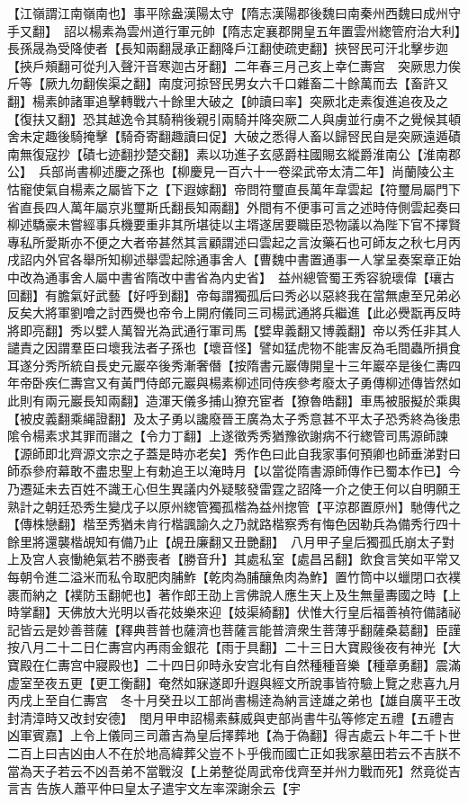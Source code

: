 【江嶺謂江南嶺南也】事平除盎漢陽太守【隋志漢陽郡後魏曰南秦州西魏曰成州守手又翻】　詔以楊素為雲州道行軍元帥【隋志定襄郡開皇五年置雲州緫管府治大利】長孫晟為受降使者【長知兩翻晟承正翻降戶江翻使疏吏翻】挾唘民可汗北擊步迦【挾戶頰翻可從刋入聲汗音寒迦古牙翻】二年春三月己亥上幸仁夀宫　突厥思力俟斤等【厥九勿翻俟渠之翻】南度河掠唘民男女六千口雜畜二十餘萬而去【畜許又翻】楊素帥諸軍追擊轉戰六十餘里大破之【帥讀曰率】突厥北走素復進追夜及之【復扶又翻】恐其越逸令其騎稍後親引兩騎并降突厥二人與虜並行虜不之覺候其頓舍未定趣後騎掩擊【騎奇寄翻趣讀曰促】大破之悉得人畜以歸唘民自是突厥遠遁磧南無復寇抄【磧七迹翻抄楚交翻】素以功進子玄感爵柱國賜玄縱爵淮南公【淮南郡公】　兵部尚書柳述慶之孫也【柳慶見一百六十一卷梁武帝太清二年】尚蘭陵公主怙寵使氣自楊素之屬皆下之【下遐嫁翻】帝問符璽直長萬年韋雲起【符璽局屬門下省直長四人萬年屬京兆璽斯氏翻長知兩翻】外間有不便事可言之述時侍側雲起奏曰柳述驕豪未嘗經事兵機要重非其所堪徒以主壻遂居要職臣恐物議以為陛下官不擇賢專私所愛斯亦不便之大者帝甚然其言顧謂述曰雲起之言汝藥石也可師友之秋七月丙戌詔内外官各舉所知柳述舉雲起除通事舍人【曹魏中書置通事一人掌呈奏案章正始中改為通事舍人屬中書省隋改中書省為内史省】　益州總管蜀王秀容貌瓌偉【瓖古回翻】有膽氣好武藝【好呼到翻】帝每謂獨孤后曰秀必以惡終我在當無慮至兄弟必反矣大將軍劉噲之討西㸑也帝令上開府儀同三司楊武通將兵繼進【此必㸑翫再反時將即亮翻】秀以嬖人萬智光為武通行軍司馬【嬖卑義翻又博義翻】帝以秀任非其人譴責之因謂羣臣曰壞我法者子孫也【壞音怪】譬如猛虎物不能害反為毛間蟲所損食耳遂分秀所統自長史元巖卒後秀漸奢僭【按隋書元巖傳開皇十三年巖卒是後仁夀四年帝卧疾仁夀宫又有黃門侍郎元巖與楊素柳述同侍疾參考廢太子勇傳柳述傳皆然如此則有兩元巖長知兩翻】造渾天儀多捕山獠充宦者【獠魯皓翻】車馬被服擬於乘輿【被皮義翻乘䋲證翻】及太子勇以讒廢晉王廣為太子秀意甚不平太子恐秀終為後患隂令楊素求其罪而譖之【令力丁翻】上遂徵秀秀猶豫欲謝病不行緫管司馬源師諫【源師即北齊源文宗之子蓋是時亦老矣】秀作色曰此自我家事何預卿也師垂涕對曰師忝參府幕敢不盡忠聖上有勅追王以淹時月【以當從隋書源師傳作已蜀本作已】今乃遷延未去百姓不識王心但生異議内外疑駭發雷霆之詔降一介之使王何以自明願王熟計之朝廷恐秀生變戊子以原州緫管獨孤楷為益州揔管【平涼郡置原州】馳傳代之【傳株戀翻】楷至秀猶未肯行楷諷諭久之乃就路楷察秀有悔色因勒兵為備秀行四十餘里將還襲楷覘知有備乃止【覘丑廉翻又丑艷翻】　八月甲子皇后獨孤氏崩太子對上及宫人哀慟絶氣若不勝喪者【勝音升】其處私室【處昌呂翻】飲食言笑如平常又每朝令進二溢米而私令取肥肉脯鮓【乾肉為脯釀魚肉為鮓】置竹筒中以蠟閉口衣襆裹而納之【襆防玉翻帊也】著作郎王劭上言佛說人應生天上及生無量夀國之時【上時掌翻】天佛放大光明以香花妓樂來迎【妓渠綺翻】伏惟大行皇后福善禎符備諸祕記皆云是妙善菩薩【釋典菩普也薩濟也菩薩言能普濟衆生菩薄乎翻薩桑葛翻】臣謹按八月二十二日仁夀宫内再雨金銀花【雨于具翻】二十三日大寶殿後夜有神光【大寶殿在仁夀宫中寢殿也】二十四日卯時永安宫北有自然種種音樂【種章勇翻】震滿虚室至夜五更【更工衡翻】奄然如寐遂即升遐與經文所說事皆符驗上覽之悲喜九月丙戌上至自仁夀宫　冬十月癸丑以工部尚書楊逹為納言逹雄之弟也【雄自廣平王改封清漳時又改封安德】　閏月甲申詔楊素蘇威與吏部尚書牛弘等修定五禮【五禮吉凶軍賓嘉】上令上儀同三司蕭吉為皇后擇葬地【為于偽翻】得吉處云卜年二千卜世二百上曰吉凶由人不在於地高緯葬父豈不卜乎俄而國亡正如我家墓田若云不吉朕不當為天子若云不凶吾弟不當戰沒【上弟整從周武帝伐齊至并州力戰而死】然竟從吉言吉告族人蕭平仲曰皇太子遣宇文左率深謝余云【宇